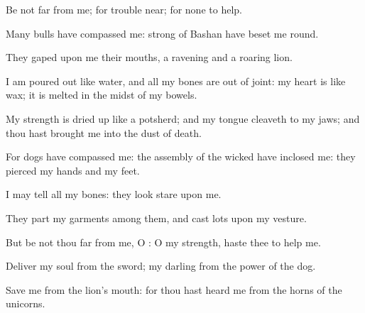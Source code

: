 {\Q {}Be not
far from me; for
trouble
{}
near; for
{} none to
help.


\par }{\Q {}Many
bulls have
compassed me:
strong
{} of
Bashan have beset me
round.


\par }{\Q {}They
gaped upon me
{} their
mouths,
{} a
ravening and a
roaring
lion.


\par }{\Q {}I am poured
out like
water, and all my
bones are out of
joint: my
heart is like
wax; it is
melted in the
midst of my
bowels.


\par }{\Q {}My
strength is dried
up like a
potsherd; and my
tongue
cleaveth to my
jaws; and thou hast
brought me into the
dust of
death.


\par }{\Q {}For
dogs have
compassed me: the
assembly of the
wicked have
inclosed me: they
pierced my
hands and my
feet.


\par }{\Q {}I may
tell all my
bones: they
look
{}
stare upon me.


\par }{\Q {}They
part my
garments among them, and
cast
lots upon my
vesture.


\par }{\Q {}But be not thou
far from me, O
{}: O my
strength,
haste thee to
help me.


\par }{\Q {}Deliver my
soul from the
sword; my
darling from the
power of the
dog.


\par }{\Q {}Save me from the
lion’s
mouth: for thou hast
heard me from the
horns of the
unicorns.


\par }{\BB \par }
